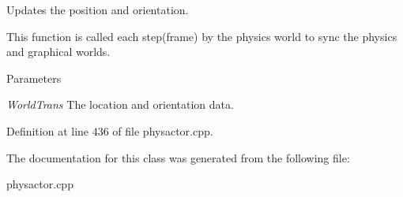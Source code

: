 Updates the position and orientation. 

This function is called each step(frame) by the physics world to sync the physics and graphical worlds. 
\begin{DoxyParams}{Parameters}
\item[{\em WorldTrans}]The location and orientation data. \end{DoxyParams}


Definition at line 436 of file physactor.cpp.



The documentation for this class was generated from the following file:\begin{DoxyCompactItemize}
\item 
physactor.cpp\end{DoxyCompactItemize}
